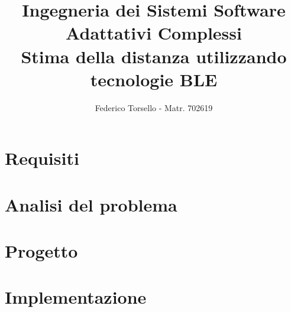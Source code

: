 \documentclass[a4paper,oneside,11pt]{report}
\title{Ingegneria dei Sistemi Software
	\\ Adattativi Complessi
	\\{\Large Stima della distanza utilizzando tecnologie BLE}}
\author{Federico Torsello - Matr. 702619}
\begin{document}
	\maketitle
	\tableofcontents
	
	
	
	\part{Requisiti}
	
	
	\part{Analisi del problema}
	
	
	
	
	
	\part{Progetto}
	
%	
%	
%	
	
	\part{Implementazione}
	
	
	
\end{document}

